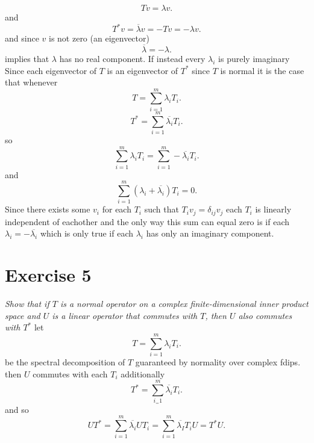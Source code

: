 \documentclass{article}
\begin{document}
\begin{enumerate}[label = (\alph*)]
                \[
                Tv = \lambda v
                .\] 
                and
                \[
                T^{*}v = \overline{\lambda}v = -Tv = -\lambda v
                .\] 
                and since $v$ is not zero (an eigenvector)
                \[
                \overline{\lambda} = -\lambda
                .\] 
                implies that $\lambda$ has no real component. If instead every $\lambda_i$ is purely imaginary
                Since each eigenvector of  $T$ is an eigenvector of $T^{*}$ since $T$ is normal it is the case that whenever
                \[
                T = \sum_{i=1}^{m}\lambda_iT_i
                .\] 
                \[
                T^{*} = \sum_{i=1}^{m}\overline{\lambda_i}T_i
                .\] 
                so
                \[
                \sum_{i=1}^{m}\lambda_iT_i = \sum_{i=1}^{m}-\overline{\lambda_i}T_i
                .\] 
                and
                \[
                \sum_{i=1}^{m}(\lambda_i+\overline{\lambda_i})T_i = 0
                .\] 
                Since there exists some $v_i$ for each $T_i$ such that $T_iv_j = \delta_{ij}v_j$ each $T_i$ is linearly independent of eachother and
                the only way this sum can equal zero is if each $\lambda_i = -\overline{\lambda_i}$ which is only true if each $\lambda_i$ has only an imaginary component.
        \end{enumerate}

        \section{Exercise 5}
        \emph{
            Show that if $T$ is a normal operator on a complex finite-dimensional inner
            product space and $U$ is a linear operator that commutes with $T$, then $U$ also commutes with $T^{*}$
        }
        let
        \[
        T = \sum_{i=1}^{m}\lambda_iT_i
        .\] 
        be the spectral decomposition of $T$ guaranteed by normality over complex fdips. then $U$ commutes with each $T_i$
        additionally 
        \[
        T^{*} = \sum_{i_=1}^{m}\overline{\lambda_i}T_i
        .\] 
        and so
        \[
        UT^{*} = \sum_{i=1}^{m}\overline{\lambda_i}UT_i = \sum_{i=1}^{m}\overline{\lambda_I}T_iU = T^{*}U
        .\] 
\end{document}
